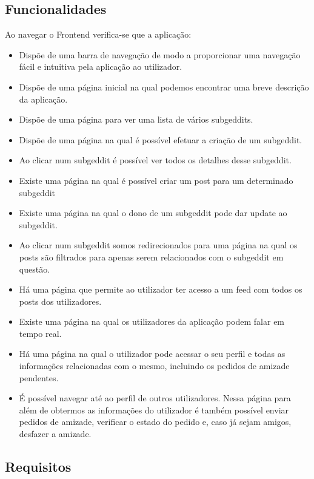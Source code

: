 \documentclass{article}
\begin{document}
	\subsection{Funcionalidades}
	Ao navegar o Frontend verifica-se que a aplicação:
	\begin{itemize}
		\item Dispõe de uma barra de navegação de modo a proporcionar uma navegação fácil e intuitiva pela aplicação ao utilizador.
		\item Dispõe de uma página inicial na qual podemos encontrar uma breve descrição da aplicação.
		\item Dispõe de uma página para ver uma lista de vários subgeddits.
		\item Dispõe de uma página na qual é possível efetuar a criação de um subgeddit.
		\item Ao clicar num subgeddit é possível ver todos os detalhes desse subgeddit.
		\item Existe uma página na qual é possível criar um post para um determinado subgeddit
		\item Existe uma página na qual o dono de um subgeddit pode dar update ao subgeddit.
		\item Ao clicar num subgeddit somos redirecionados para uma página na qual os posts são filtrados para apenas serem relacionados com o subgeddit em questão.
		\item Há uma página que permite ao utilizador ter acesso a um feed com todos os posts dos utilizadores.
		\item Existe uma página na qual os utilizadores da aplicação podem falar em tempo real.
		\item Há uma página na qual o utilizador pode acessar o seu perfil e todas as informações relacionadas com o mesmo, incluindo os pedidos de amizade pendentes.
		\item É possível navegar até ao perfil de outros utilizadores. Nessa página para além de obtermos as informações do utilizador é também possível enviar pedidos de amizade, verificar o estado do pedido e, caso já sejam amigos, desfazer a amizade.
	\end{itemize}
	\subsection{Requisitos}
	
\end{document}

